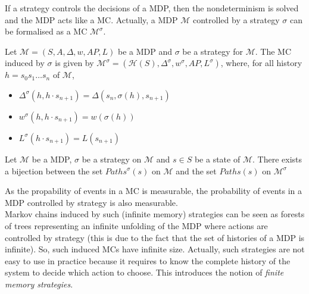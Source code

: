 If a strategy controls the decisions of a MDP, then the nondeterminism is solved
and the MDP acts like a MC. Actually, a MDP $\mathcal{M}$ controlled by a strategy $\sigma$ can be formalised as a MC $\mathcal{M}^\sigma$.

\begin{definition}
Let $\mathcal{M} = (S, A, \Delta, w, AP, L)$ be a MDP and $\sigma$ be a strategy for
$\mathcal{M}$. The MC induced by $\sigma$ is given by
$ \mathcal{M}^\sigma = (\mathcal{H}(S), \Delta^\sigma, w^\sigma, AP, L^\sigma) $, where, for all history
$h = s_0 s_1 \dots s_n$ of $\mathcal{M}$,
\begin{itemize}
\item $\Delta^\sigma(h, h \cdot s_{n+1}) = \Delta(s_n, \sigma(h), s_{n+1})$
\item $w^\sigma(h, h \cdot s_{n+1}) = w(\sigma(h))$
\item $L^\sigma(h\cdot s_{n+1}) = L(s_{n+1})$
\end{itemize}
\end{definition}

\begin{property}
  Let $\mathcal{M}$ be a MDP, $\sigma$ be a strategy on $\mathcal{M}$ and $s\in S$ be a state of $\mathcal{M}$. There exists a bijection between the
  set $Paths^\sigma(s)$ on $\mathcal{M}$ and the set $Paths(s)$ on $\mathcal{M}^\sigma$
\end{property}

As the propability of events in a MC is measurable, the probability of events in a MDP controlled by strategy is also measurable. \\

Markov chains induced by such (infinite memory) strategies can be seen as forests of trees representing an infinite unfolding of the MDP where actions are controlled by strategy (this is due to the fact that the set of histories of a MDP is infinite). So, such induced MCs have infinite size. Actually, such strategies are not easy to use in practice because it requires to
know the complete history of the system to decide which action to choose. This introduces the notion of \textit{finite memory strategies}.

